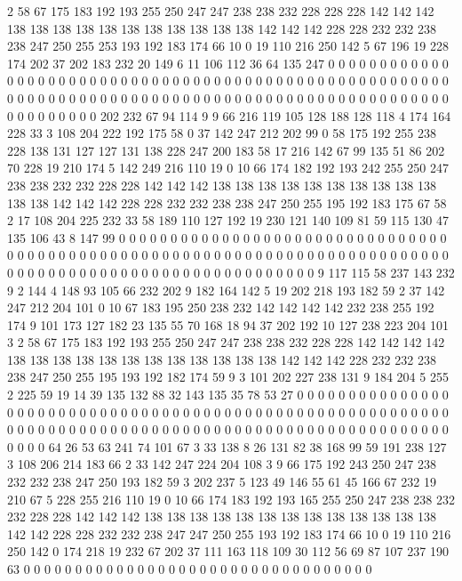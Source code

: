 2 58 67 175 183 192 193 255 250 247 247 238 238 232 228 228 228 142 142 142
138 138 138 138 138 138 138 138 138 138 138 142 142 142 228 228 232 232 238 238
247 250 255 253 193 192 183 174 66 10 0 19 110 216 250 142 5 67 196 19
228 174 202 37 202 183 232 20 149 6 11 106 112 36 64 135 247 0 0 0
0 0 0 0 0 0 0 0 0 0 0 0 0 0 0 0 0 0 0 0
0 0 0 0 0 0 0 0 0 0 0 0 0 0 0 0 0 0 0 0
0 0 0 0 0 0 0 0 0 0 0 0 0 0 0 0 0 0 0 0
0 0 0 0 0 0 0 0 0 0 0 0 0 0 0 0 0 0 0 0
0 0 0 0 0 0 0 0 0 0 0 0 0 0 0 0 0 0 0 0
0 0 0 0 202 232 67 94 114 9 9 66 216 119 105 128 188 128 118 4
174 164 228 33 3 108 204 222 192 175 58 0 37 142 247 212 202 99 0 58
175 192 255 238 228 138 131 127 127 131 138 228 247 200 183 58 17 216 142 67
99 135 51 86 202 70 228 19 210 174 5 142 249 216 110 19 0 10 66 174
182 192 193 242 255 250 247 238 238 232 232 228 228 142 142 142 138 138 138 138
138 138 138 138 138 138 138 138 142 142 142 228 228 232 232 238 238 247 250 255
195 192 183 175 67 58 2 17 108 204 225 232 33 58 189 110 127 192 19 230
121 140 109 81 59 115 130 47 135 106 43 8 147 99 0 0 0 0 0 0
0 0 0 0 0 0 0 0 0 0 0 0 0 0 0 0 0 0 0 0
0 0 0 0 0 0 0 0 0 0 0 0 0 0 0 0 0 0 0 0
0 0 0 0 0 0 0 0 0 0 0 0 0 0 0 0 0 0 0 0
0 0 0 0 0 0 0 0 0 0 0 0 0 0 0 0 0 0 0 0
0 0 0 0 0 0 0 0 0 0 0 0 0 0 0 0 0 0 0 9
117 115 58 237 143 232 9 2 144 4 148 93 105 66 232 202 9 182 164 142
5 19 202 218 193 182 59 2 37 142 247 212 204 101 0 10 67 183 195 250
238 232 142 142 142 142 232 238 255 192 174 9 101 173 127 182 23 135 55 70
168 18 94 37 202 192 10 127 238 223 204 101 3 2 58 67 175 183 192 193
255 250 247 247 238 238 232 228 228 142 142 142 142 138 138 138 138 138 138 138
138 138 138 138 138 142 142 142 228 232 232 238 238 247 250 255 195 193 192 182
174 59 9 3 101 202 227 238 131 9 184 204 5 255 2 225 59 19 14 39
135 132 88 32 143 135 35 78 53 27 0 0 0 0 0 0 0 0 0 0
0 0 0 0 0 0 0 0 0 0 0 0 0 0 0 0 0 0 0 0
0 0 0 0 0 0 0 0 0 0 0 0 0 0 0 0 0 0 0 0
0 0 0 0 0 0 0 0 0 0 0 0 0 0 0 0 0 0 0 0
0 0 0 0 0 0 0 0 0 0 0 0 0 0 0 0 0 0 0 0
0 0 0 0 0 0 0 0 0 0 0 0 0 0 0 64 26 53 63 241
74 101 67 3 33 138 8 26 131 82 38 168 99 59 191 238 127 3 108 206
214 183 66 2 33 142 247 224 204 108 3 9 66 175 192 243 250 247 238 232
232 238 247 250 193 182 59 3 202 237 5 123 49 146 55 61 45 166 67 232
19 210 67 5 228 255 216 110 19 0 10 66 174 183 192 193 165 255 250 247
238 238 232 232 228 228 142 142 142 138 138 138 138 138 138 138 138 138 138 138
138 138 142 142 228 228 232 232 238 247 247 250 255 193 192 183 174 66 10 0
19 110 216 250 142 0 174 218 19 232 67 202 37 111 163 118 109 30 112 56
69 87 107 237 190 63 0 0 0 0 0 0 0 0 0 0 0 0 0 0
0 0 0 0 0 0 0 0 0 0 0 0 0 0 0 0 0 0 0 0
